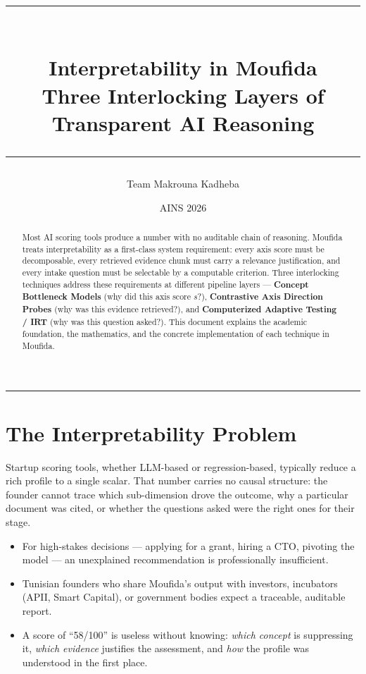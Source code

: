 \documentclass[11pt,a4paper]{article}
\title{%
  {\color{IntBlue}\rule{\linewidth}{1.5pt}}\\[6pt]
  \textbf{\Large Interpretability in Moufida}\\[4pt]
  {\normalsize Three Interlocking Layers of Transparent AI Reasoning}\\[6pt]
  {\color{IntBlue}\rule{\linewidth}{0.8pt}}
}
\author{Team Makrouna Kadheba}
\date{AINS 2026}
\begin{document}
\maketitle\thispagestyle{empty}

\begin{abstract}\small
Most AI scoring tools produce a number with no auditable chain of reasoning.
Moufida treats interpretability as a first-class system requirement: every axis score
must be decomposable, every retrieved evidence chunk must carry a relevance justification,
and every intake question must be selectable by a computable criterion.
Three interlocking techniques address these requirements at different pipeline layers —
\textbf{Concept Bottleneck Models} (why did this axis score $s$?),
\textbf{Contrastive Axis Direction Probes} (why was this evidence retrieved?),
and \textbf{Computerized Adaptive Testing / IRT} (why was this question asked?).
This document explains the academic foundation, the mathematics, and the concrete
implementation of each technique in Moufida.
\end{abstract}

\tableofcontents
\vspace{6pt}
\noindent\color{IntBlue}\rule{\linewidth}{0.4pt}

\section{The Interpretability Problem}

Startup scoring tools, whether LLM-based or regression-based, typically reduce a rich
profile to a single scalar. That number carries no causal structure: the founder cannot
trace which sub-dimension drove the outcome, why a particular document was cited,
or whether the questions asked were the right ones for their stage.

\begin{itemize}
  \item For high-stakes decisions — applying for a grant, hiring a CTO, pivoting the model —
        an unexplained recommendation is professionally insufficient.
  \item Tunisian founders who share Moufida's output with investors, incubators (APII,
        Smart Capital), or government bodies expect a traceable, auditable report.
  \item A score of ``58/100'' is useless without knowing: \emph{which concept} is suppressing
        it, \emph{which evidence} justifies the assessment, and \emph{how} the profile
        was understood in the first place.
\end{itemize}
\end{document}
